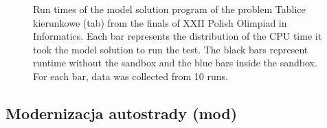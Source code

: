 \documentclass[en]{pracamgr}
\begin{document}
\begin{appendices}
\begin{figure}[H]
\caption{Run times of the model solution program of the problem Tablice kierunkowe (tab) from the finals of XXII Polish Olimpiad in Informatics. Each bar represents the distribution of the CPU time it took the model solution to run the test. The black bars represent runtime without the sandbox and the blue bars inside the sandbox. For each bar, data was collected from 10 runs.}
\label{figure:tab_model_solution_cpu_time}
\end{figure}

\subsection{Modernizacja autostrady (mod)}


\end{appendices}
\end{document}
